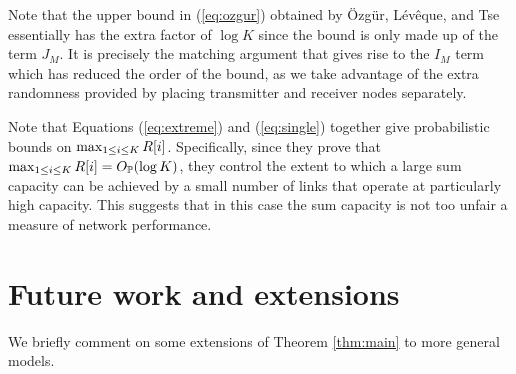 \documentclass[journal]{IEEEtran}
\begin{document}
Note that the upper bound in (\ref{eq:ozgur}) obtained by {\"O}zg{\"u}r, L{\'e}v{\^e}que, and 
Tse \cite{ozgur} essentially has the extra factor of $\log K$ since the bound is only made up
of the term $J_M$. It is precisely the matching argument that gives rise to the $I_M$ term
which has reduced the order of the bound, as we take advantage of the extra randomness provided
by placing transmitter and receiver nodes separately.

Note that Equations (\ref{eq:extreme}) and (\ref{eq:single}) together give probabilistic
bounds on $\max_{1 \leq i \leq K} R[i]$. Specifically, since they prove that
$\max_{1 \leq i \leq K} R[i] = O_{{\mathbb {P}}}(\log K)$, they control the extent to which a
large sum capacity can be achieved by a small number of links that operate at particularly
high capacity. This suggests that in this case the sum capacity is not too unfair a
measure of network performance.
%
\section{Future work and extensions} \label{sec:future}
%
We briefly comment on some extensions of Theorem \ref{thm:main} to more
general models.
%
\end{document}
